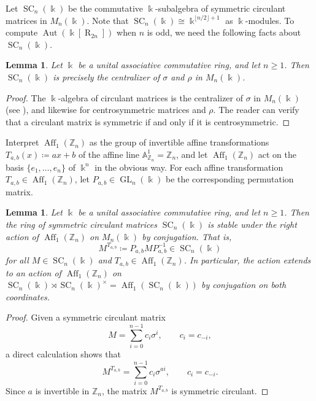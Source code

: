 \documentclass[12 pt]{amsart}
\newtheorem{lemma}[theorem]{Lemma}
\theoremstyle{definition}
\theoremstyle{remark}
\numberwithin{equation}{section}
\newcommand{\Aut}{\operatorname{Aut}}
\newcommand{\R}{\operatorname{R}}
\newcommand{\GL}{\operatorname{GL}}
\newcommand{\Aff}{\operatorname{Aff}}
\newcommand{\SC}{\operatorname{SC}}
\newcommand{\Z}{\mathbb{Z}}
\newcommand{\inv}{^{-1}}
\renewcommand{\k}{\Bbbk}
\begin{document}
Let $\SC_n(\k)$ be the commutative $\k$-subalgebra of symmetric circulant matrices in $M_n(\k)$. Note that $\SC_n(\k)\cong\k^{\lfloor n/2\rfloor+1}$ as $\k$-modules.  
To compute $\Aut(\k[\R_{2n}])$ when $n$ is odd, we need the following facts about $\SC_n(\k)$.

\begin{lemma}\label{lem:scnk}
    Let $\k$ be a unital associative commutative ring, and let $n\geq 1$. Then $\SC_n(\k)$ is precisely the centralizer of $\sigma$ and $\rho$ in $M_n(\k)$.
\end{lemma}

\begin{proof}
    The $\k$-algebra of circulant matrices is the centralizer of $\sigma$ in $M_n(\k)$ (see \cite[Thm.\ 3.1.1]{circulant}), and likewise for centrosymmetric matrices and $\rho$. The reader can verify that a circulant matrix is symmetric if and only if it is centrosymmetric.
\end{proof}

Interpret $\Aff_1(\Z_n)$ as the group of invertible affine transformations $T_{a,b}(x)\coloneq ax+b$ of the affine line $\mathbb A^1_{\Z_n}=\Z_n$, and let $\Aff_1(\Z_n)$ act on the basis $\{e_1,\dots,e_n\}$ of $\k^n$ in the obvious way. For each affine transformation $T_{a,b}\in\Aff_1(\Z_n)$, let $P_{a,b}\in\GL_n(\k)$ be the corresponding permutation matrix. 
\begin{lemma}\label{lemma:conjugation}
    Let $\k$ be a unital associative commutative ring, and let $n\geq 1$. Then the ring of symmetric circulant matrices $\SC_n(\k)$ is stable under the right action of $\Aff_1(\Z_n)$ on $M_n(\k)$ by conjugation. That is,
    \[
    M^{T_{a,b}} \coloneq P_{a,b}MP_{a,b}\inv\in\SC_n(\k)
    \]
    for all $M\in\SC_n(\k)$ and $T_{a,b}\in\Aff_1(\Z_n)$. In particular, the action extends to an action of $\Aff_1(\Z_n)$ on $\SC_n(\k)\rtimes\SC_n(\k)^\times=\Aff_1(\SC_n(\k))$ by conjugation on both coordinates.
\end{lemma}

\begin{proof}
    Given a symmetric circulant matrix \[
    M=\sum^{n-1}_{i=0}c_i\sigma^i,\qquad c_i=c_{-i},
    \]
    a direct calculation shows that
    \[
     M^{T_{a,b}}=\sum^{n-1}_{i=0}c_i\sigma^{ai},\qquad c_i=c_{-i}.
    \]
    Since $a$ is invertible in $\Z_n$, the matrix $M^{T_{a,b}}$ is symmetric circulant.
\end{proof}
\end{document}
